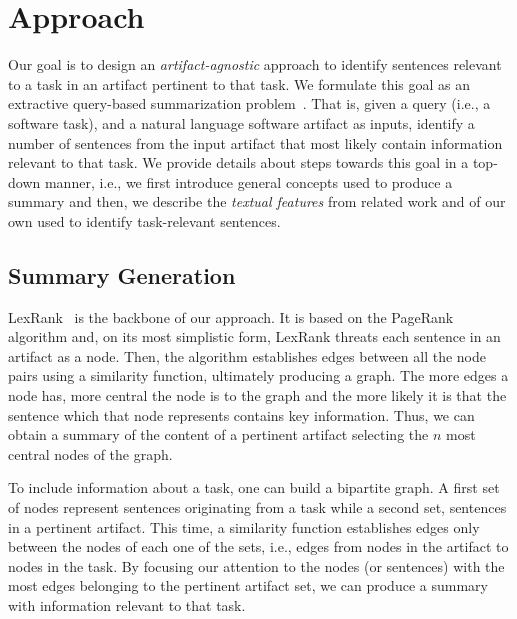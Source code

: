 \section{Approach}
\label{cp5:approaches}





Our goal is to design an \textit{artifact-agnostic} approach
to identify sentences relevant to a task in an artifact pertinent to that task.
We formulate this goal as an extractive query-based summarization problem~\cite{Goldsteinet1999}.
That is, given a query (i.e., a software task),
and a natural language software artifact as inputs,
identify a number of sentences from the input artifact that
most likely contain information relevant to that task. 
We provide details about steps towards this goal
in a top-down manner, i.e., we first introduce general concepts
used to produce a summary and then, we describe
the \textit{textual features} from related work and of our own used to identify task-relevant sentences.




\subsection{Summary Generation}


LexRank~\cite{Erkan2004} is the backbone of our approach. 
It is based on the PageRank~\cite{Page1999} algorithm
and, on its most simplistic form, LexRank threats each sentence in an artifact as a node.
Then, the algorithm
establishes edges between all the node pairs using a similarity function, ultimately producing a graph. 
The more edges a node has, more central the node is to the graph and the more likely it is that the sentence 
which that node represents contains key information. 
Thus, we can obtain a summary of the content of a pertinent artifact selecting the $n$ most central nodes of the graph. 


To include information about a task, one can build a bipartite graph.
A first set of nodes represent sentences originating from a task while a second set, sentences in a pertinent artifact.
This time,  a similarity function 
establishes edges only  between the nodes of each one of the sets, i.e., edges from nodes in the artifact to nodes in the task.
By focusing our attention to the nodes (or sentences) with the most edges belonging to the pertinent artifact set, we can produce a summary with information relevant to that task.




